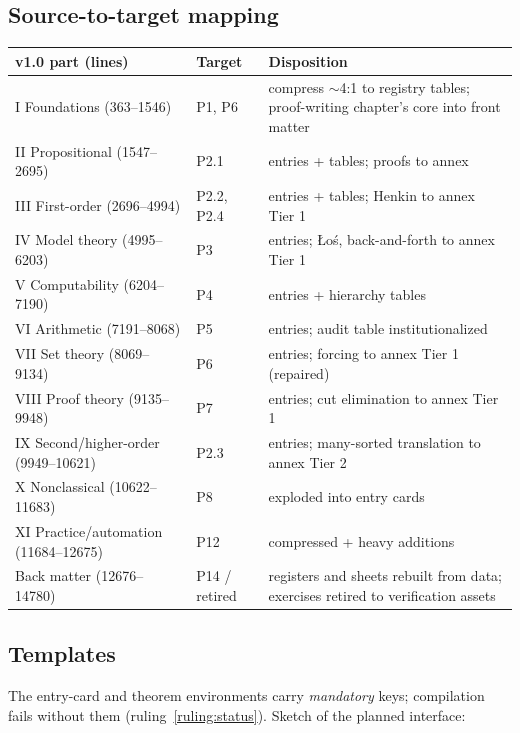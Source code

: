 \documentclass[11pt,letterpaper]{article}
\begin{document}
\subsection{Source-to-target mapping}
\begin{center}\small
\begin{tabular}{@{}llp{2.9in}@{}}
\toprule
\textbf{v1.0 part (lines)} & \textbf{Target} & \textbf{Disposition} \\
\midrule
I Foundations (363--1546) & P1, P6 & compress $\sim$4:1 to registry tables; proof-writing chapter's core into front matter \\
II Propositional (1547--2695) & P2.1 & entries + tables; proofs to annex \\
III First-order (2696--4994) & P2.2, P2.4 & entries + tables; Henkin to annex Tier 1 \\
IV Model theory (4995--6203) & P3 & entries; \L o\'s, back-and-forth to annex Tier 1 \\
V Computability (6204--7190) & P4 & entries + hierarchy tables \\
VI Arithmetic (7191--8068) & P5 & entries; audit table institutionalized \\
VII Set theory (8069--9134) & P6 & entries; forcing to annex Tier 1 (repaired) \\
VIII Proof theory (9135--9948) & P7 & entries; cut elimination to annex Tier 1 \\
IX Second/higher-order (9949--10621) & P2.3 & entries; many-sorted translation to annex Tier 2 \\
X Nonclassical (10622--11683) & P8 & exploded into entry cards \\
XI Practice/automation (11684--12675) & P12 & compressed + heavy additions \\
Back matter (12676--14780) & P14 / retired & registers and sheets rebuilt from data; exercises retired to verification assets \\
\bottomrule
\end{tabular}
\end{center}

\subsection{Templates}
\label{sec:templates}

The entry-card and theorem environments carry \emph{mandatory} keys;
compilation fails without them (ruling~\ref{ruling:status}).  Sketch of
the planned interface:
\end{document}
